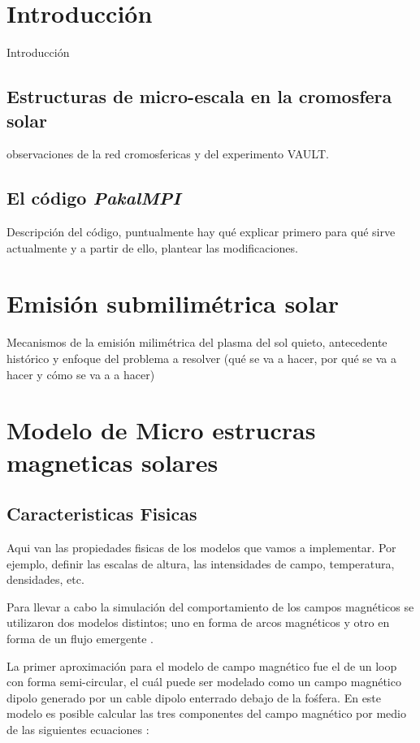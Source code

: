 \documentclass[9pt]{book}
\begin{document}
  \renewcommand{\thepage}{\arabic{page}}
  \setcounter{page}{1}
  \renewcommand{\tablename}{Tabla}

 \chapter{Introducci\'on}
Introducci\'on
\section{Estructuras de micro-escala en la cromosfera solar}
observaciones de la red cromosfericas y del experimento VAULT.
\section{El c\'odigo \emph{PakalMPI}}
Descripci\'on del c\'odigo, puntualmente hay qu\'e explicar primero para qu\'e sirve actualmente y a partir de ello, plantear las modificaciones.


\chapter{Emisi\'on submilim\'etrica solar}
Mecanismos de la emisi\'on milim\'etrica del plasma del sol quieto, antecedente hist\'orico y enfoque del problema a resolver (qu\'e se va a hacer, por qu\'e se va a hacer y c\'omo se va a a hacer)
  
\chapter{Modelo de Micro estrucras magneticas solares}
\section{Caracteristicas Fisicas}
Aqui van las propiedades fisicas de los modelos que vamos a implementar. Por ejemplo, definir las escalas de altura, las intensidades de campo, temperatura, densidades, etc.

Para llevar a cabo la simulaci\'on del comportamiento de los campos magn\'eticos se utilizaron dos modelos distintos; uno en forma de arcos magn\'eticos \cite{loops} y otro en forma de un flujo emergente \cite{flujoemergente}.

La primer aproximaci\'on para el modelo de campo magn\'etico fue el de un loop con forma semi-circular, el cu\'al puede ser modelado como un campo magn\'etico dipolo generado por un cable dipolo enterrado debajo de la fo\'sfera.
En este modelo es posible calcular las tres componentes del campo magn\'etico por medio de las siguientes ecuaciones :
\end{document}
